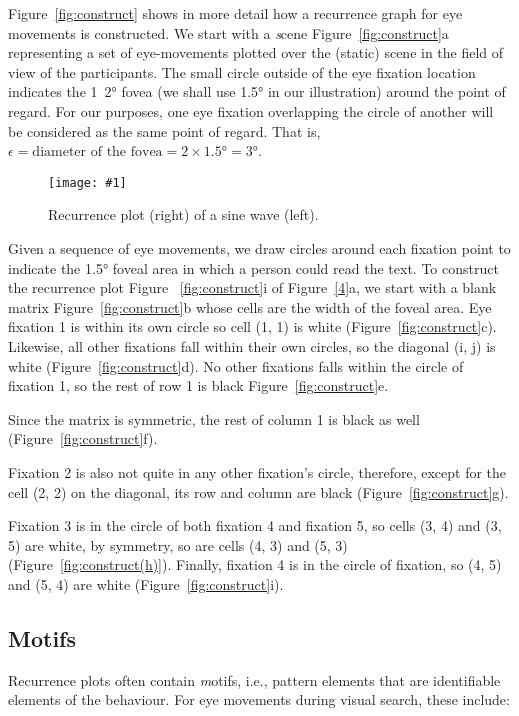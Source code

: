 \documentclass{sigchi}
\newcommand{\insertpicture}[2]{\begin{center}\texttt{[image: \#1]}\end{center}}
\begin{document}
Figure~\ref{fig:construct} shows in more detail how a recurrence graph for eye
movements is constructed. We start with a {\emph scene} Figure~\ref{fig:construct}a
representing  a set of eye-movements plotted over the (static) scene in the
field of view of the participants. The small circle outside of the eye
fixation location indicates the 1~2° fovea (we shall use 1.5° in our
illustration) around the point of regard. For our purposes, one eye
fixation overlapping the circle of another will be considered as the same
point of regard. That is, $\epsilon = \text{diameter of the fovea} = 2
\times 1.5° = 3° $. 

\begin{figure}
	\insertpicture{figures/sine.pdf}{0.45}
	\caption{Recurrence plot (right) of a sine wave (left).\label{fig:sine}}
\end{figure}


Given a sequence of eye movements, we draw circles around each fixation
point to indicate the 1.5° foveal area in which a person could read the
text. To construct the recurrence plot Figure ~\ref{fig:construct}i of
Figure~\ref{4}a, we start with a blank matrix Figure~\ref{fig:construct}b whose
cells are the width of the foveal area. Eye fixation 1  is within its own
circle so cell (1, 1) is white (Figure~\ref{fig:construct}c). Likewise, 
all other fixations fall within their own circles, so the diagonal (i, j) 
is white (Figure~\ref{fig:construct}d). No other fixations falls within 
the circle of fixation 1, so the rest of row 1 is black 
Figure~\ref{fig:construct}e. 

Since the matrix is symmetric, the rest of column 1 is black as well
(Figure~\ref{fig:construct}f). 

Fixation 2  is also not quite in any other fixation’s circle, therefore,
except for the cell (2, 2) on the diagonal, its row and column are black
(Figure~\ref{fig:construct}g). 

Fixation 3 is in the circle of both fixation 4  and fixation 5, so cells
(3, 4) and (3, 5) are white, by symmetry, so are cells (4, 3) and (5, 3)
(Figure~\ref{fig:construct(h)}). Finally, fixation 4 is in the circle of fixation,
so (4, 5) and (5, 4) are white (Figure~\ref{fig:construct}i).

\subsection{Motifs} Recurrence plots often contain {\emph motifs}, i.e.,
pattern elements that are identifiable elements of the behaviour. For eye
movements during visual search, these include:
\end{document}
